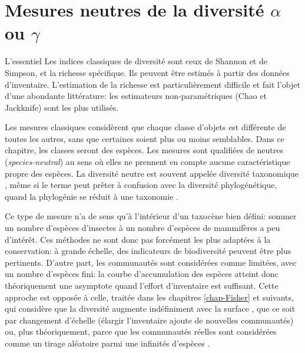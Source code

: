 \documentclass[
  11pt,
  french,
  a4paper,
  extrafontsizes,onecolumn,openright
  ]{memoir}
\newenvironment{Summary}
  {\begin{bclogo}[logo=\bctrombone, noborder=true, couleur=lightgray!50]{L'essentiel}\parindent0pt}
  {\end{bclogo}}
\newlength{\rf}
\begin{document}
\hypertarget{chap-MesuresNeutres}{%
\chapter{\texorpdfstring{Mesures neutres de la diversité \(\alpha\) ou \(\gamma\)}{Mesures neutres de la diversité \textbackslash alpha ou \textbackslash gamma}}\label{chap-MesuresNeutres}}

\scriptsize

\begin{Summary}
Les indices classiques de diversité sont ceux de Shannon et de Simpson,
et la richesse spécifique. Ils peuvent être estimés à partir des données
d'inventaire. L'estimation de la richesse est particulièrement difficile
et fait l'objet d'une abondante littérature: les estimateurs
non-paramétriques (Chao et Jackknife) sont les plus utilisés.
\end{Summary}

\normalsize

Les mesures classiques \autocite{Peet1974} considèrent que chaque classe d'objets est différente de toutes les autres, sans que certaines soient plus ou moins semblables.
Dans ce chapitre, les classes seront des espèces.
Les mesures sont qualifiées de neutres (\emph{species-neutral}) au sens où elles ne prennent en compte aucune caractéristique propre des espèces.
La diversité neutre est souvent appelée diversité taxonomique \autocite{Devictor2010,Stegen2011}, même si le terme peut prêter à confusion avec la diversité phylogénétique, quand la phylogénie se réduit à une taxonomie \autocite{Clarke2001,Ricotta2003c}.

Ce type de mesure n'a de sens qu'à l'intérieur d'un taxocène bien défini: sommer un nombre d'espèces d'insectes à un nombre d'espèces de mammifères a peu d'intérêt.
Ces méthodes ne sont donc pas forcément les plus adaptées à la conservation: à grande échelle, des indicateurs de biodiversité \autocite{Balmford2003} peuvent être plus pertinents.
D'autre part, les communautés sont considérées comme limitées, avec un nombre d'espèces fini: la courbe d'accumulation des espèces atteint donc théoriquement une asymptote quand l'effort d'inventaire est suffisant.
Cette approche est opposée à celle, traitée dans les chapitres \ref{chap-Fisher} et suivants, qui considère que la diversité augmente indéfiniment avec la surface \autocite{Williamson2001}, que ce soit par changement d'échelle (élargir l'inventaire ajoute de nouvelles communautés) ou, plus théoriquement, parce que les communautés réelles sont considérées comme un tirage aléatoire parmi une infinités d'espèces \autocite{Fisher1943}.
\end{document}
